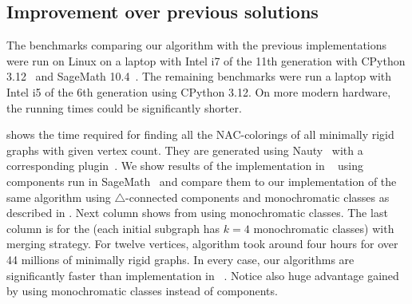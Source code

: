 \subsection{Improvement over previous solutions}

The benchmarks comparing our algorithm with the previous implementations
were run on Linux on a laptop with Intel i7 of the 11th generation
with CPython 3.12~\cite{cpython} and SageMath 10.4~\cite{sagemath}.
The remaining benchmarks were run a laptop with Intel i5 of the 6th generation
using CPython 3.12.
On more modern hardware, the running times could be significantly shorter.

shows the time required for finding all the NAC-colorings
of all minimally rigid graphs with given vertex count.
%
They are generated using Nauty~\cite{nauty}
with a corresponding plugin~\cite{nauty_plugin}.
%
We show results of the implementation
in \flexrilog{}~\cite{flexrilog} using \trcon{} components
run in SageMath~\cite{sagemath}
and compare them to our implementation of the same \Naive{} algorithm
using $\triangle$-connected components
and monochromatic classes as described in .
Next column shows \NaiveCycles{} from 
using monochromatic classes.
The last column is for the \NeighborsDegree{} (each initial subgraph has $k=4$ monochromatic classes)
with \MergeLinear{} merging strategy.
For twelve vertices, \Neighbors{} algorithm took around four hours for over 44 millions of minimally rigid graphs.
%
In every case, our algorithms are significantly faster than implementation in \flexrilog{}~\cite{flexrilog}.
Notice also huge advantage gained by using monochromatic classes instead of \trcon{} components.
%
